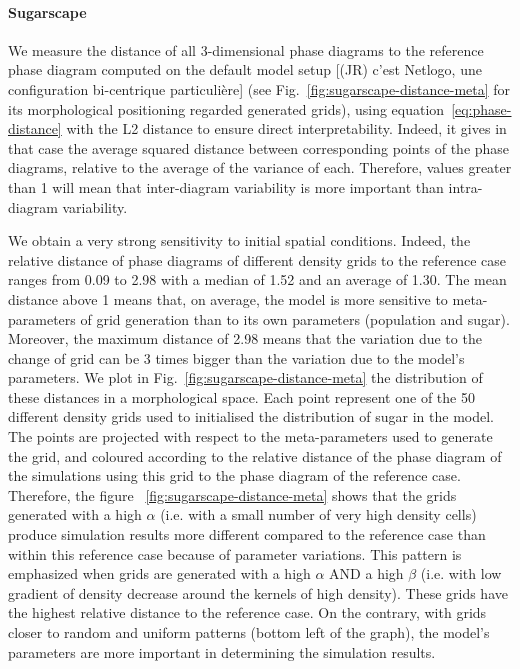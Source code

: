 \documentclass[Royal,sageh,times]{sagej}
\begin{document}

\paragraph{Sugarscape} We measure the distance of all 3-dimensional phase diagrams to the reference phase diagram computed on the default model setup [(JR) c'est Netlogo, une configuration bi-centrique particulière] (see Fig.~\ref{fig:sugarscape-distance-meta} for its morphological positioning regarded generated grids), using equation~\ref{eq:phase-distance} with the L2 distance to ensure direct interpretability.  Indeed, it gives in that case the average squared distance between corresponding points of the phase diagrams, relative to the average of the variance of each. Therefore, values greater than 1 will mean that inter-diagram variability is more important than intra-diagram variability.



We obtain a very strong sensitivity to initial spatial conditions. Indeed, the relative distance of phase diagrams of different density grids to the reference case ranges from 0.09 to 2.98 with a median of 1.52 and an average of 1.30. The mean distance above 1 means that, on average, the model is more sensitive to meta-parameters of grid generation than to its own parameters (population and sugar). Moreover, the maximum distance of 2.98 means that the variation due to the change of grid can be 3 times bigger than the variation due to the model's parameters. We plot in Fig.~\ref{fig:sugarscape-distance-meta} the distribution of these distances in a morphological space. Each point represent one of the 50 different density grids used to initialised the distribution of sugar in the model. The points are projected with respect to the meta-parameters used to generate the grid, and coloured according to the relative distance of the phase diagram of the simulations using this grid to the phase diagram of the reference case. Therefore, the figure ~\ref{fig:sugarscape-distance-meta} shows that the grids generated with a high $\alpha$ (i.e. with a small number of very high density cells) produce simulation results more different compared to the reference case than within this reference case because of parameter variations. This pattern is emphasized when grids are generated with a high $\alpha$ AND a high $\beta$ (i.e. with low gradient of density decrease around the kernels of high density). These grids have the highest relative distance to the reference case. On the contrary, with grids closer to random and uniform patterns (bottom left of the graph), the model's parameters are more important in determining the simulation results. 
\end{document}
